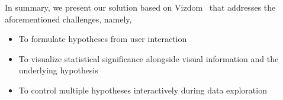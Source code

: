 In summary, we present our solution based on Vizdom~\cite{vizdom} that addresses the aforementioned challenges, namely,
\begin{itemize}
    \item To formulate hypotheses from user interaction
    \item To visualize statistical significance alongside visual information and the underlying hypothesis
    \item To control multiple hypotheses interactively during data exploration
\end{itemize}
